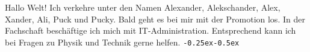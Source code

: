 \begin{multicols}{2}
{
Hallo Welt! Ich verkehre unter den Namen Alexander, Alekschander, Alex, Xander, Ali, Puck und Pucky. Bald geht es bei mir mit der Promotion los. 
In der Fachschaft beschäftige ich mich mit IT-Administration. Entsprechend kann ich bei Fragen zu Physik und Technik gerne helfen. \texttt{\kern-0.25ex\kern-0.5ex}
}


\end{multicols}
